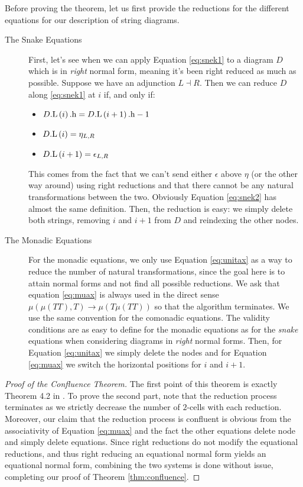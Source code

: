 Before proving the theorem, let us first provide the reductions for the different
equations for our description of string diagrams.
\begin{description}
	\item[The Snake Equations]
	      First, let's see when we can apply Equation \ref{eq:snek1} to a diagram $D$ which is in \emph{right} normal form, meaning it's been right reduced as much as possible.
	      Suppose we have an adjunction $L \dashv R$.
	      Then we can reduce $D$ along \eqref{eq:snek1} at $i$ if, and only if:
	      \begin{itemize}
		      \item $D\mathrm{.L}\left(i\right)\mathrm{.h} = D\mathrm{.L}\left(i + 1\right)\mathrm{.h} - 1$
		      \item $D\mathrm{.L}\left(i\right) = \eta_{L, R}$
		      \item $D\mathrm{.L}\left(i + 1\right) = \epsilon_{L, R}$
	      \end{itemize}
	      This comes from the fact that we can't send either $\epsilon$
	      above $\eta$ (or the other way around) using right reductions and
	      that there cannot be any natural transformations between the two.
	      Obviously Equation \ref{eq:snek2} has almost the same definition.
	      Then, the reduction is easy: we simply delete both strings,
	      removing $i$ and $i + 1$ from $D$ and reindexing the other nodes.
	\item[The Monadic Equations] For the monadic equations, we only use
	      Equation \ref{eq:unitax} as a way to reduce the number of natural
	      transformations, since the goal here is to attain normal forms
	      and not find all possible reductions.
	      We ask that equation \ref{eq:muax} is always used in the direct
	      sense $\mu\left( \mu\left( TT \right),T \right) \to \mu\left(
		      T\mu\left( TT \right) \right)$ so that the algorithm terminates.
	      We use the same convention for the comonadic equations.
	      The validity conditions are as easy to define for the monadic
	      equations as for the \emph{snake} equations when considering
	      diagrams in \emph{right} normal forms.
	      Then, for Equation \eqref{eq:unitax} we simply delete the nodes
	      and for Equation \eqref{eq:muax} we switch the horizontal
	      positions for $i$ and $i + 1$.
\end{description}

\begin{proof}[Proof of the Confluence Theorem]
	The first point of this theorem is exactly Theorem 4.2
	in \cite{delpeuchNormalizationPlanarString2022}.
	To prove the second part, note that the reduction process terminates as
	we strictly decrease the number of $2$-cells with each reduction.
	Moreover, our claim that the reduction process is confluent is obvious
	from the associativity of Equation \eqref{eq:muax} and the fact the other
	equations delete node and simply delete equations.
	Since right reductions do not modify the equational reductions, and thus
	right reducing an equational normal form yields an equational normal form,
	combining the two systems is done without issue, completing our proof of
	Theorem \ref{thm:confluence}.
\end{proof}


